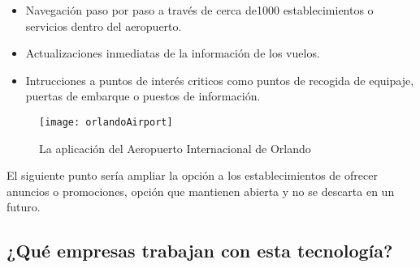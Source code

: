 \begin{itemize}
\item Navegación paso por paso a través de cerca de1000 establecimientos o servicios dentro del aeropuerto. 
\item Actualizaciones inmediatas de la información de los vuelos. 
\item Intrucciones a puntos de interés criticos como puntos de recogida de equipaje, puertas de embarque o puestos de información.
\end{itemize}

\begin{figure}[H]
	\centering
	\texttt{[image: orlandoAirport]}
	\caption{La aplicación del Aeropuerto Internacional de Orlando}
	\label{fig:orlandoAirport}
\end{figure}

El siguiente punto sería ampliar la opción a los establecimientos de ofrecer anuncios o promociones, opción que mantienen abierta y no se descarta en un futuro.


\subsection{¿Qué empresas trabajan con esta tecnología?}





